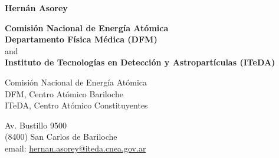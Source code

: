 \documentclass[11pt,a4paper]{article}
\begin{document}
  \begin{center}{\huge \textbf {Hernán Asorey}}\\[1cm]\end{center}
  \begin{center}
	{\textbf{Comisión Nacional de Energía Atómica}}\\
	{\textbf{Departamento Física Médica (DFM)}} \\ and \\
	{\textbf{Instituto de Tecnologías en Detección y Astropartículas (ITeDA)}}\\
  \end{center}
  \begin{minipage}[t]{0.55\textwidth}
	Comisión Nacional de Energía Atómica\\
	\hspace*{1em}DFM, Centro Atómico Bariloche\\
	\hspace*{1em}ITeDA, Centro Atómico Constituyentes\\
  \end{minipage}\hspace*{0.02\textwidth}
  \begin{minipage}[t]{0.45\textwidth}
    Av. Bustillo 9500\\
    (8400) San Carlos de Bariloche\\
	email: \href{mailto:hernan.asorey@iteda.cnea.gov.ar}{hernan.asorey@iteda.cnea.gov.ar}\\
  \end{minipage}
\end{document}
